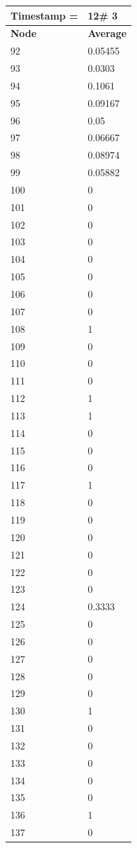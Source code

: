 \begin{tabular}{|l||l|}
\hline
\textbf{Timestamp =} & \textbf{12}\# 3\\\hline
	\textbf{Node} & \textbf{Average} \\ \hline
\hline
	92 & 0.05455 \\ \hline
	93 & 0.0303 \\ \hline
	94 & 0.1061 \\ \hline
	95 & 0.09167 \\ \hline
	96 & 0.05 \\ \hline
	97 & 0.06667 \\ \hline
	98 & 0.08974 \\ \hline
	99 & 0.05882 \\ \hline
	100 & 0 \\ \hline
	101 & 0 \\ \hline
	102 & 0 \\ \hline
	103 & 0 \\ \hline
	104 & 0 \\ \hline
	105 & 0 \\ \hline
	106 & 0 \\ \hline
	107 & 0 \\ \hline
	108 & 1 \\ \hline
	109 & 0 \\ \hline
	110 & 0 \\ \hline
	111 & 0 \\ \hline
	112 & 1 \\ \hline
	113 & 1 \\ \hline
	114 & 0 \\ \hline
	115 & 0 \\ \hline
	116 & 0 \\ \hline
	117 & 1 \\ \hline
	118 & 0 \\ \hline
	119 & 0 \\ \hline
	120 & 0 \\ \hline
	121 & 0 \\ \hline
	122 & 0 \\ \hline
	123 & 0 \\ \hline
	124 & 0.3333 \\ \hline
	125 & 0 \\ \hline
	126 & 0 \\ \hline
	127 & 0 \\ \hline
	128 & 0 \\ \hline
	129 & 0 \\ \hline
	130 & 1 \\ \hline
	131 & 0 \\ \hline
	132 & 0 \\ \hline
	133 & 0 \\ \hline
	134 & 0 \\ \hline
	135 & 0 \\ \hline
	136 & 1 \\ \hline
	137 & 0 \\ \hline
\end{tabular}


